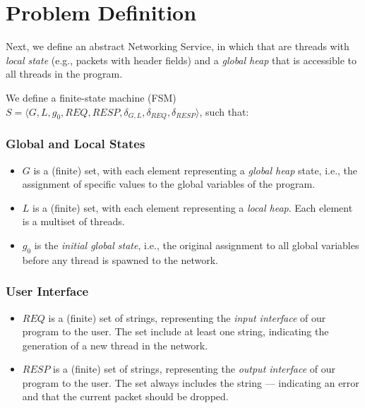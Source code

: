 \section{Problem Definition}
\label{sec:problemDefinition}



Next, we define an abstract Networking Service, in which that are threads with 
\textit{local state} (e.g., packets with header fields) and a \textit{global 
	heap} that is accessible to all threads in the program.

We define a finite-state machine (FSM) $S=\langle 
G,L,g_0,REQ,RESP, \delta_{G,L} , \delta_{REQ}, \delta_{RESP}
\rangle$, such that:

\subsubsection{Global and Local States}

\begin{itemize}
	
	\item
	$G$ is a (finite) set, with each element representing a \textit{global 
		heap} state, 
	i.e., the assignment of specific values to the global variables of the 
	program.
	
	\item
	$L$ is a (finite) set, with each element representing a \textit{local 
		heap}. 
	Each 
	element is a multiset of threads.
	
	\item
	$g_0$ is the \textit{initial global state}, i.e., the original assignment 
	to 
	all global variables before any thread is spawned to the network.
	
\end{itemize}

\subsubsection{User Interface}

\begin{itemize}
	
	\item 
	$REQ$ is a (finite) set of strings, representing the \textit{input 
		interface} of our program to the user. The set include at least one 
	\SPAWN{} string, indicating the generation of a new thread in the 
	network.
	
	\item 
	$RESP$ is a (finite) set of strings, representing the \textit{output 
		interface} of our program to the user.
	The set always includes the string \DROP --- indicating an error and 
	that the current packet should be dropped.
	
\end{itemize}


